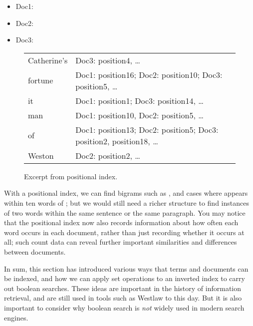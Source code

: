 \begin{itemize}

\item Doc1: 

\item Doc2: 

\item Doc3: 

\end{itemize}


\begin{figure}[htb!]
\begin{tabular}{p{2cm} @{\quad$\to$\quad}p{7cm}}
Catherine's & Doc3: position4, \ldots \\
fortune & Doc1: position16; Doc2: position10; Doc3: position5, \ldots \\
it & Doc1: position1; Doc3: position14, \ldots \\
man & Doc1: position10, Doc2: position5, \ldots  \\
of & Doc1: position13; Doc2: position5; Doc3: position2, position18, \ldots \\
Weston & Doc2: position2, \ldots \\
\end{tabular}
\caption{Excerpt from positional index.}
\label{fig:pos-index}
\end{figure}


With a positional index, we can find bigrams such as , and cases where  appears within ten words of ; but we would still need a richer structure to find instances of two words within the same sentence or the same paragraph.  You may notice that the positional index now also records information about how often each word occurs in each document, rather than just recording whether it occurs at all; such count data can reveal further important similarities and differences between documents.

In sum, this section has introduced various ways that terms and documents can be indexed, and how we can apply set operations to an inverted index to carry out boolean searches.  These ideas are important in the history of information retrieval, and are still used in tools such as Westlaw to this day. But it is also important to consider why boolean search is \emph{not} widely used in modern search engines.   

